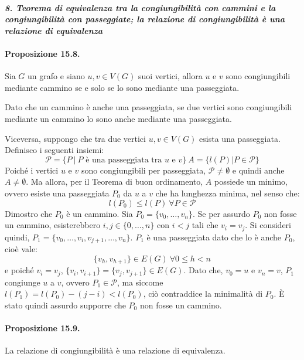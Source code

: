 \documentclass[12pt, a4paper]{report}
\theoremstyle{definition}
\begin{document}
\newpage
\paragraph{\emph{8. Teorema di equivalenza tra la congiungibilità con cammini e
la congiungibilità con passeggiate; la relazione di congiungibilità è una
relazione di equivalenza}}
\paragraph{Proposizione 15.8.}
Sia $G$ un grafo e siano $u,v\in V(G)$ suoi vertici, allora $u$ e $v$ sono
congiungibili mediante cammino se e solo se lo sono mediante una passeggiata.

\begin{demonstration}
    Dato che un cammino è anche una passeggiata, se due vertici sono congiungibili
    mediante un cammino lo sono anche mediante una passeggiata.

    Viceversa, suppongo che tra due vertici $u,v\in V(G)$ esista una passeggiata.
    Definisco i seguenti insiemi:
        \[\mathcal{P}=\{P\ |\ P\text{ è una passeggiata tra $u$ e $v$}\}\
        A=\{l(P)|P\in\mathcal{P}\}\]
    Poiché i vertici $u$ e $v$ sono congiungibili per passeggiata, $\mathcal{P}
    \neq\emptyset$ e quindi anche $A\neq\emptyset$. Ma allora, per il Teorema di
    buon ordinamento, $A$ possiede un minimo, ovvero esiste una passeggiata $P_0$
    da $u$ a $v$ che ha lunghezza minima, nel senso che:
    \[l(P_0)\leq l(P)\ \forall P\in\mathcal{P}\]
    Dimostro che $P_0$ è un cammino. Sia $P_0=\{v_0,\dots,v_n\}$. Se per assurdo
    $P_0$ non fosse un cammino, esisterebbero $i,j\in\{0,\dots,n\}$ con $i<j$ tali
    che $v_i=v_j$. Si consideri quindi, $P_1=\{v_0,\dots,v_i,v_{j+1},\dots,v_n\}$.
    $P_1$ è una passeggiata dato che lo è anche $P_0$, cioè vale:
    \[\{v_h,v_{h+1}\}\in E(G)\ \forall 0\leq h<n\]
    e poiché $v_i=v_j$, $\{v_i,v_{i+1}\}=\{v_j,v_{j+1}\}\in E(G)$. Dato che,
    $v_0=u$ e $v_n=v$, $P_1$ congiunge $u$ a $v$, ovvero $P_1\in\mathcal{P}$, ma
    siccome $l(P_1)=l(P_0)-(j-i)<l(P_0)$, ciò contraddice la minimalità di $P_0$.
    È stato quindi assurdo supporre che $P_0$ non fosse un cammino.
\end{demonstration}

\paragraph{Proposizione 15.9.} La relazione di congiungibilità è una relazione
di equivalenza.
\end{document}
